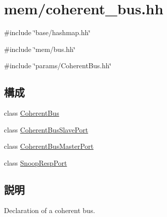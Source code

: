 \hypertarget{coherent__bus_8hh}{
\section{mem/coherent\_\-bus.hh}
\label{coherent__bus_8hh}
}
{\ttfamily \#include \char`\"{}base/hashmap.hh\char`\"{}}\par
{\ttfamily \#include \char`\"{}mem/bus.hh\char`\"{}}\par
{\ttfamily \#include \char`\"{}params/CoherentBus.hh\char`\"{}}\par
\subsection*{構成}
\begin{DoxyCompactItemize}
\item 
class \hyperlink{classCoherentBus}{CoherentBus}
\item 
class \hyperlink{classCoherentBus_1_1CoherentBusSlavePort}{CoherentBusSlavePort}
\item 
class \hyperlink{classCoherentBus_1_1CoherentBusMasterPort}{CoherentBusMasterPort}
\item 
class \hyperlink{classCoherentBus_1_1SnoopRespPort}{SnoopRespPort}
\end{DoxyCompactItemize}


\subsection{説明}
Declaration of a coherent bus. 